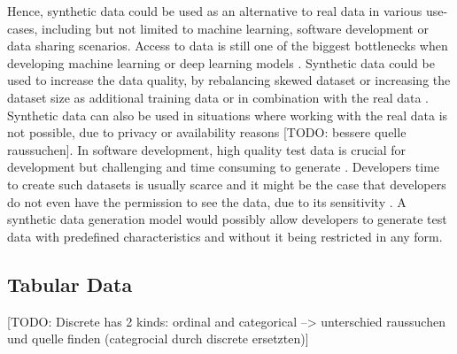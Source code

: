 Hence, synthetic data could be used as an alternative to real data in various use-cases,
including but not limited to machine learning, software development or data sharing scenarios.
Access to data is still one of the biggest bottlenecks when developing machine learning or deep learning \glspl{model} \cite{fan2020RelationalDataSynthesisa}.
Synthetic data could be used to increase the data quality, by rebalancing skewed dataset \cite{zhao2022CTABGANEnhancingTabular} 
or increasing the dataset size as additional training data or in combination with the real data \cite{leminh2021AirGenGANbasedSynthetica, kim2021OCTGANNeuralODEbased}.
Synthetic data can also be used in situations where working with the real data is not possible, due to privacy or availability reasons [TODO: bessere quelle raussuchen]\cite{zhao2022CTABGANEnhancingTabular}.
In software development, high quality test data is crucial for development but challenging and time consuming to generate \cite{whiting2008CreatingRealisticScenariobased}.
Developers time to create such datasets is usually scarce and it might be the case that developers do not even have the permission to see the data, due to its sensitivity \cite{whiting2008CreatingRealisticScenariobased}.
A synthetic data generation \gls{model} would possibly allow developers to generate test data with predefined characteristics and without it being restricted in any form.


\subsection{Tabular Data}
\label{ch:preliminaries-dataSynthesis-tabularData}
[TODO: Discrete has 2 kinds: ordinal and categorical --> unterschied raussuchen und quelle finden (categrocial durch discrete ersetzten)]


